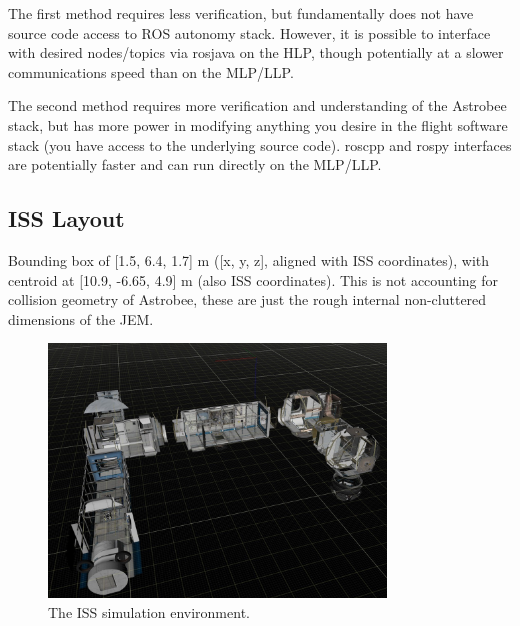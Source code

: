\documentclass{article}
\begin{document}
The first method requires less verification, but fundamentally does not have source code access to ROS autonomy stack. However, it is possible to interface with desired nodes/topics via rosjava on the HLP, though potentially at a slower communications speed than on the MLP/LLP.

The second method requires more verification and understanding of the Astrobee stack, but has more power in modifying anything you desire in the flight software stack (you have access to the underlying source code). roscpp and rospy interfaces are potentially faster and can run directly on the MLP/LLP.


\subsection{ISS Layout}

Bounding box of [1.5, 6.4, 1.7] m ([x, y, z], aligned with ISS coordinates), with centroid at [10.9, -6.65, 4.9] m (also ISS coordinates). This is not accounting for collision geometry of Astrobee, these are just the rough internal non-cluttered dimensions of the JEM.

\begin{figure}[h!]
	\centering
	\includegraphics[width=0.8\textwidth]{img/ISS_env.jpg}
	\caption{The ISS simulation environment.}
\end{figure}
\end{document}
